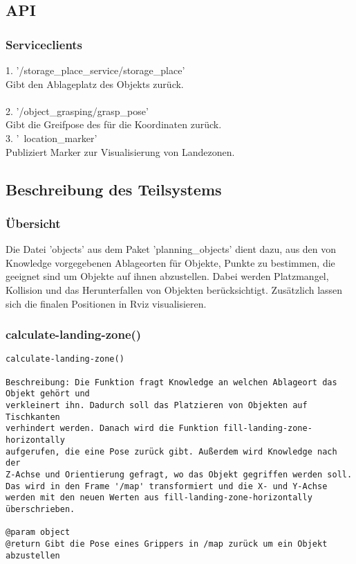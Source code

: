 \documentclass{suturo}
\begin{document}
\begin{figure}[!htb]
\end{figure}


\subsection{API}
\subsubsection{Serviceclients}
1. '/storage\_place\_service/storage\_place' \\
Gibt den Ablageplatz des Objekts zur\"uck.\\ \\
2. '/object\_grasping/grasp\_pose' \\
Gibt die Greifpose des für die Koordinaten zurück.\\
3. '~location\_marker' \\
Publiziert Marker zur Visualisierung von Landezonen.
\subsection{Beschreibung des Teilsystems}
\subsubsection{\"Ubersicht}
Die Datei 'objects' aus dem Paket 'planning\_objects' dient dazu, aus den von Knowledge vorgegebenen Ablageorten für Objekte, Punkte zu bestimmen, die geeignet sind um Objekte auf ihnen abzustellen. Dabei werden Platzmangel, Kollision und das Herunterfallen von Objekten berücksichtigt. Zusätzlich lassen sich die finalen Positionen in Rviz visualisieren.

\subsubsection{calculate-landing-zone()}
\begin{verbatim}
calculate-landing-zone()

Beschreibung: Die Funktion fragt Knowledge an welchen Ablageort das Objekt gehört und
verkleinert ihn. Dadurch soll das Platzieren von Objekten auf Tischkanten
verhindert werden. Danach wird die Funktion fill-landing-zone-horizontally
aufgerufen, die eine Pose zurück gibt. Außerdem wird Knowledge nach der 
Z-Achse und Orientierung gefragt, wo das Objekt gegriffen werden soll. 
Das wird in den Frame '/map' transformiert und die X- und Y-Achse
werden mit den neuen Werten aus fill-landing-zone-horizontally überschrieben.

@param object
@return Gibt die Pose eines Grippers in /map zurück um ein Objekt abzustellen
\end{verbatim}
\end{document}
